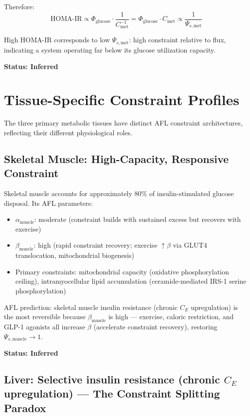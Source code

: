 \documentclass[11pt]{article}
\begin{document}
Therefore:
\begin{equation}
    \mathrm{HOMA\text{-}IR} \propto \Phi_{\mathrm{glucose}} \cdot \frac{1}{C_{\mathrm{met}}^{-1}} = \Phi_{\mathrm{glucose}} \cdot C_{\mathrm{met}} \propto \frac{1}{\Psi_{s,\mathrm{met}}}
\end{equation}

High HOMA-IR corresponds to low $\Psi_{s,\mathrm{met}}$: high constraint relative to flux, indicating a system operating far below its glucose utilization capacity.

\textbf{Status: Inferred}

\section{Tissue-Specific Constraint Profiles}

The three primary metabolic tissues have distinct AFL constraint architectures, reflecting their different physiological roles.

\subsection{Skeletal Muscle: High-Capacity, Responsive Constraint}

Skeletal muscle accounts for approximately 80\% of insulin-stimulated glucose disposal. Its AFL parameters:
\begin{itemize}
    \item $\alpha_{\mathrm{muscle}}$: moderate (constraint builds with sustained excess but recovers with exercise)
    \item $\beta_{\mathrm{muscle}}$: high (rapid constraint recovery; exercise $\uparrow \beta$ via GLUT4 translocation, mitochondrial biogenesis)
    \item Primary constraints: mitochondrial capacity (oxidative phosphorylation ceiling), intramyocellular lipid accumulation (ceramide-mediated IRS-1 serine phosphorylation)
\end{itemize}

AFL prediction: skeletal muscle insulin resistance (chronic $C_E$ upregulation) is the most reversible because $\beta_{\mathrm{muscle}}$ is high --- exercise, caloric restriction, and GLP-1 agonists all increase $\beta$ (accelerate constraint recovery), restoring $\Psi_{s,\mathrm{muscle}} \to 1$.

\textbf{Status: Inferred}

\subsection{Liver: Selective insulin resistance (chronic $C_E$ upregulation) --- The Constraint Splitting Paradox}
\end{document}
